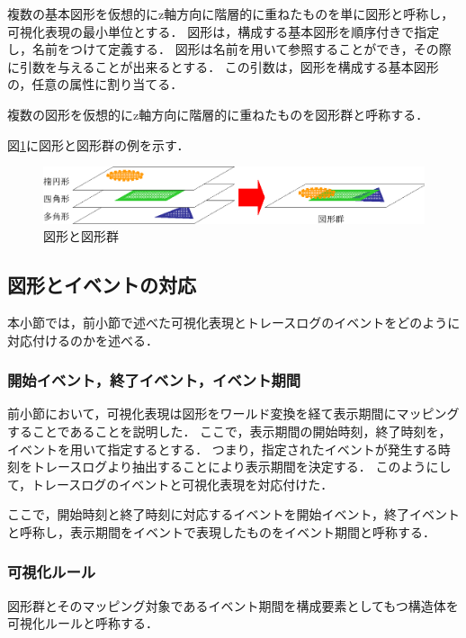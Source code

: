 複数の基本図形を仮想的にz軸方向に階層的に重ねたものを単に図形と呼称し，可視化表現の最小単位とする．
図形は，構成する基本図形を順序付きで指定し，名前をつけて定義する．
図形は名前を用いて参照することができ，その際に引数を与えることが出来るとする．
この引数は，図形を構成する基本図形の，任意の属性に割り当てる．

複数の図形を仮想的にz軸方向に階層的に重ねたものを図形群と呼称する．

図\ref{fig:shapes}に図形と図形群の例を示す．

\begin{figure}[p]
\begin{center}
\includegraphics[scale=0.75]{img/shapes.eps}
\caption{図形と図形群}
\label{fig:shapes}
\end{center}
\end{figure}

\subsection{図形とイベントの対応}

本小節では，前小節で述べた可視化表現とトレースログのイベントをどのように対応付けるのかを述べる．

\subsubsection{開始イベント，終了イベント，イベント期間}
前小節において，可視化表現は図形をワールド変換を経て表示期間にマッピングすることであることを説明した．
ここで，表示期間の開始時刻，終了時刻を，イベントを用いて指定するとする．
つまり，指定されたイベントが発生する時刻をトレースログより抽出することにより表示期間を決定する．
このようにして，トレースログのイベントと可視化表現を対応付けた．

ここで，開始時刻と終了時刻に対応するイベントを開始イベント，終了イベントと呼称し，表示期間をイベントで表現したものをイベント期間と呼称する．

\subsubsection{可視化ルール}
図形群とそのマッピング対象であるイベント期間を構成要素としてもつ構造体を可視化ルールと呼称する．

